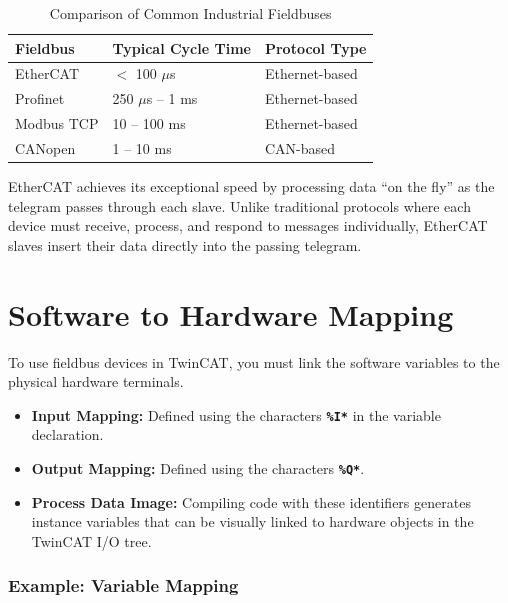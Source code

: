 \documentclass[11pt,a4paper]{article}
\begin{document}
\begin{table}[h]
\centering
\begin{tabular}{@{}lll@{}}
\toprule
\textbf{Fieldbus} & \textbf{Typical Cycle Time} & \textbf{Protocol Type} \\
\midrule
EtherCAT & $<$ 100 $\mu$s & Ethernet-based \\
Profinet & 250 $\mu$s -- 1 ms & Ethernet-based \\
Modbus TCP & 10 -- 100 ms & Ethernet-based \\
CANopen & 1 -- 10 ms & CAN-based \\
\bottomrule
\end{tabular}
\caption{Comparison of Common Industrial Fieldbuses}
\end{table}

\begin{tipbox}
EtherCAT achieves its exceptional speed by processing data ``on the fly'' as the telegram passes through each slave. Unlike traditional protocols where each device must receive, process, and respond to messages individually, EtherCAT slaves insert their data directly into the passing telegram.
\end{tipbox}

\section{Software to Hardware Mapping}

To use fieldbus devices in TwinCAT, you must link the software variables to the physical hardware terminals.

\begin{itemize}[leftmargin=*]
    \item \textbf{Input Mapping:} Defined using the characters \textbf{\texttt{\%I*}} in the variable declaration.
    \item \textbf{Output Mapping:} Defined using the characters \textbf{\texttt{\%Q*}}.
    \item \textbf{Process Data Image:} Compiling code with these identifiers generates instance variables that can be visually linked to hardware objects in the TwinCAT I/O tree.
\end{itemize}

\subsubsection*{Example: Variable Mapping}
\end{document}
